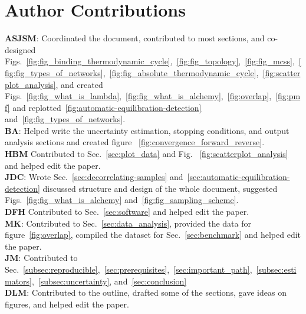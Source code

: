\documentclass[9pt,bestpractices,pubversion]{livecoms}
\begin{document}
\section*{Author Contributions}
%
\textbf{ASJSM}: Coordinated the document, contributed to most sections, and co-designed Figs.~\ref{fig:fig_binding_thermodynamic_cycle},~\ref{fig:fig_topology},~\ref{fig:fig_mcss},~\ref{fig:fig_types_of_networks},~\ref{fig:fig_absolute_thermodynamic_cycle},~\ref{fig:scatterplot_analysis}, and created Figs.~\ref{fig:fig_what_is_lambda},~\ref{fig:fig_what_is_alchemy},~\ref{fig:overlap},~\ref{fig:pmf} and replotted~\ref{fig:automatic-equilibration-detection} and~\ref{fig:fig_types_of_networks}.\\
\textbf{BA}: Helped write the uncertainty estimation, stopping conditions, and output analysis sections and created figure ~\ref{fig:convergence_forward_reverse}.\\
\textbf{HBM} Contributed to Sec.~\ref{sec:plot_data} and Fig.~ \ref{fig:scatterplot_analysis} and helped edit the paper.\\
\textbf{JDC}: Wrote Sec.~\ref{sec:decorrelating-samples} and~\ref{sec:automatic-equilibration-detection} discussed structure and design of the whole document, suggested Figs.~\ref{fig:fig_what_is_alchemy} and~\ref{fig:fig_sampling_scheme}. \\
\textbf{DFH} Contributed to Sec.~\ref{sec:software} and helped edit the paper. \\
\textbf{MK}: Contributed to Sec.~\ref{sec:data_analysis}, provided the data for figure~\ref{fig:overlap}, compiled the dataset for Sec.~\ref{sec:benchmark} and helped edit the paper.\\
\textbf{JM}: Contributed to Sec.~\ref{subsec:reproducible},~\ref{sec:prerequisites},~\ref{sec:important_path},~\ref{subsec:estimators},~\ref{subsec:uncertainty}, and~\ref{sec:conclusion}\\
\textbf{DLM}: Contributed to the outline, drafted some of the sections, gave ideas on figures, and helped edit the paper.\\
\end{document}
